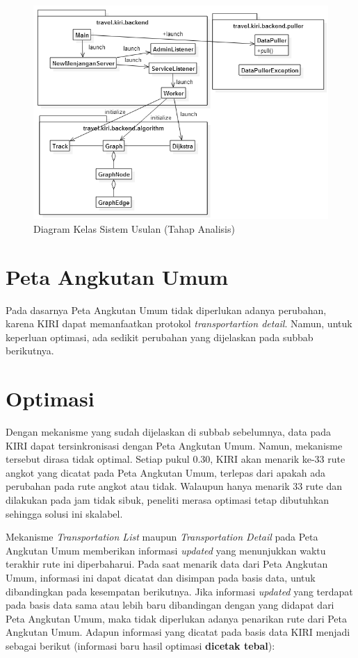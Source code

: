 \begin{figure}
	\centering
	\includegraphics[scale=0.5]{Gambar/3_diagram_kelas_sistem_usulan}
	\caption{Diagram Kelas Sistem Usulan (Tahap Analisis)} 
	\label{fig:3_diagram_kelas_sistem_usulan}
\end{figure}

\section{Peta Angkutan Umum}

Pada dasarnya Peta Angkutan Umum tidak diperlukan adanya perubahan, karena KIRI dapat memanfaatkan protokol \textit{transportartion detail}. Namun, untuk keperluan optimasi, ada sedikit perubahan yang dijelaskan pada subbab berikutnya.

\section{Optimasi}

Dengan mekanisme yang sudah dijelaskan di subbab sebelumnya, data pada KIRI dapat tersinkronisasi dengan Peta Angkutan Umum. Namun, mekanisme tersebut dirasa tidak optimal. Setiap pukul 0.30, KIRI akan menarik ke-33 rute angkot yang dicatat pada Peta Angkutan Umum, terlepas dari apakah ada perubahan pada rute angkot atau tidak. Walaupun hanya menarik 33 rute dan dilakukan pada jam tidak sibuk, peneliti merasa optimasi tetap dibutuhkan sehingga solusi ini skalabel.

Mekanisme \textit{Transportation List} maupun \textit{Transportation Detail} pada Peta Angkutan Umum memberikan informasi \textit{updated} yang menunjukkan waktu terakhir rute ini diperbaharui. Pada saat menarik data dari Peta Angkutan Umum, informasi ini dapat dicatat dan disimpan pada basis data, untuk dibandingkan pada kesempatan berikutnya. Jika informasi \textit{updated} yang terdapat pada basis data sama atau lebih baru dibandingan dengan yang didapat dari Peta Angkutan Umum, maka tidak diperlukan adanya penarikan rute dari Peta Angkutan Umum. Adapun informasi yang dicatat pada basis data KIRI menjadi sebagai berikut (informasi baru hasil optimasi \textbf{dicetak tebal}):

